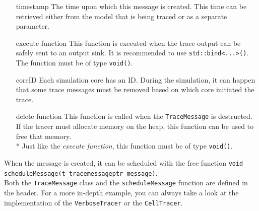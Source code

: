\begin{itemize}
	\item[timestamp] The time upon which this message is created. This time can be retrieved either from the model that is being traced or as a separate parameter.
	\item[execute function] This function is executed when the trace output can be safely sent to an output sink. It is recommended to use \lstinline{std::bind<...>()}. The function must be of type \lstinline{void()}.
	\item[coreID] Each simulation core has an ID. During the simulation, it can happen that some trace messages must be removed based on which core initiated the trace.
	\item[delete function] This function is called when the \lstinline{TraceMessage} is destructed. If the tracer must allocate memory on the heap, this function can be used to free that memory.\\*
		Just like the \emph{execute function}, this function must be of type \lstinline{void()}.
\end{itemize}
When the message is created, it can be scheduled with the free function \lstinline{void scheduleMessage(t_tracemessageptr message)}.\\
Both the \lstinline{TraceMessage} class and the \lstinline{scheduleMessage} function are defined in the  header. For a more in-depth example, you can always take a look at the implementation of the \lstinline{VerboseTracer} or the \lstinline{CellTracer}.